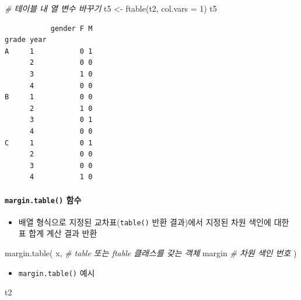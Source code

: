\documentclass[
  11pt,
]{krantz}
\newenvironment{Shaded}{\begin{snugshade}}{\end{snugshade}}
\newcommand{\AttributeTok}[1]{\textcolor[rgb]{0.61,0.61,0.61}{#1}}
\newcommand{\CommentTok}[1]{\textcolor[rgb]{0.37,0.37,0.37}{\textit{#1}}}
\newcommand{\DecValTok}[1]{\textcolor[rgb]{0.06,0.06,0.06}{#1}}
\newcommand{\FunctionTok}[1]{\textcolor[rgb]{0,0,0}{#1}}
\newcommand{\NormalTok}[1]{#1}
\newcommand{\OtherTok}[1]{\textcolor[rgb]{0.37,0.37,0.37}{#1}}
\providecommand{\tightlist}{%
  \setlength{\itemsep}{0pt}\setlength{\parskip}{0pt}}
\begin{document}
\begin{Shaded}
\begin{Highlighting}[]
\CommentTok{\# 테이블 내 열 변수 바꾸기}
\NormalTok{t5 }\OtherTok{\textless{}{-}} \FunctionTok{ftable}\NormalTok{(t2, }\AttributeTok{col.vars =} \DecValTok{1}\NormalTok{)}
\NormalTok{t5}
\end{Highlighting}
\end{Shaded}

\begin{verbatim}
           gender F M
grade year           
A     1           0 1
      2           0 0
      3           1 0
      4           0 0
B     1           0 0
      2           1 0
      3           0 1
      4           0 0
C     1           0 1
      2           0 0
      3           0 0
      4           1 0
\end{verbatim}

\normalsize

\hypertarget{table-fun4}{%
\paragraph*{\texorpdfstring{\texttt{margin.table()} 함수}{margin.table() 함수}}\label{table-fun4}}

\begin{itemize}
\tightlist
\item
  배열 형식으로 지정된 교차표(\texttt{table()} 반환 결과)에서 지정된 차원 색인에 대한 표 합계 계산 결과 반환
\end{itemize}

\footnotesize

\begin{Shaded}
\begin{Highlighting}[]
\FunctionTok{margin.table}\NormalTok{(}
\NormalTok{  x,  }\CommentTok{\# table 또는 ftable 클래스를 갖는 객체}
\NormalTok{  margin }\CommentTok{\# 차원 색인 번호}
\NormalTok{)}
\end{Highlighting}
\end{Shaded}

\normalsize

\begin{itemize}
\tightlist
\item
  \texttt{margin.table()} 예시
\end{itemize}

\footnotesize

\begin{Shaded}
\begin{Highlighting}[]
\NormalTok{t2}
\end{Highlighting}
\end{Shaded}
\end{document}
